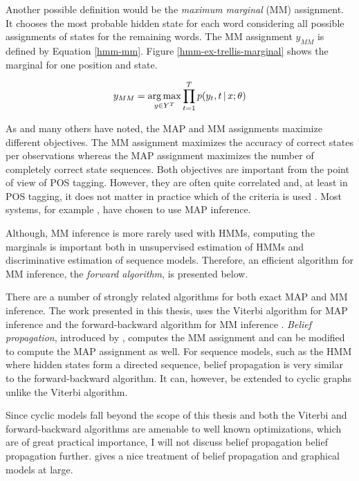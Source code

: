 Another possible definition would be the
{\it maximum marginal} (MM) assignment. It chooses the most probable
hidden state for each word considering all possible assignments of states for the remaining words. The MM assignment $y_{MM}$ is defined by Equation
\eqref{hmm-mm}. Figure \ref{hmm-ex-trellis-marginal} shows the
marginal for one position and state.


\begin{equation}
y_{MM} = \operatorname*{arg\,max}_{y\in Y^T} \prod_{t = 1}^T p(y_t, t \mbox{$ \, | \, $} x\mbox{$ ; \, $}\theta)\label{hmm-mm}
\end{equation}

As \cite{Merialdo1994} and many others have noted, the MAP and MM
assignments maximize different objectives. The MM assignment maximizes
the accuracy of correct states per observations whereas the MAP
assignment maximizes the number of completely correct state
sequences. Both objectives are important from the point of view of POS
tagging. However, they are often quite correlated and, at least in POS
tagging, it does not matter in practice which of the criteria is used
\citep{Merialdo1994}. Most systems, for example
\cite{Church1988,Brants2000,Halacsy2007}, have chosen to use MAP
inference.

Although, MM inference is more rarely used with HMMs, computing the
marginals is important both in unsupervised estimation of HMMs and
discriminative estimation of sequence models. Therefore, an efficient
algorithm for MM inference, the {\it forward algorithm}, is presented below.

There are a number of strongly related algorithms for both exact MAP
and MM inference. The work presented in this thesis, uses the Viterbi
algorithm for MAP inference and the forward-backward algorithm for MM
inference \citep{Rabiner1989}. {\it Belief propagation}, introduced by
\cite{Pearl1982}, computes the MM assignment and can be modified to
compute the MAP assignment as well. For sequence models, such as the
HMM where hidden states form a directed sequence, belief propagation
is very similar to the forward-backward algorithm. It can, however, be
extended to cyclic graphs \citep{Weiss2000} unlike the Viterbi
algorithm.

Since cyclic models fall beyond the scope of this thesis and both the
Viterbi and forward-backward algorithms are amenable to well known
optimizations, which are of great practical importance, I will not
discuss belief propagation belief propagation
further. \cite{Koller2009} gives a nice treatment of belief
propagation and graphical models at large.

